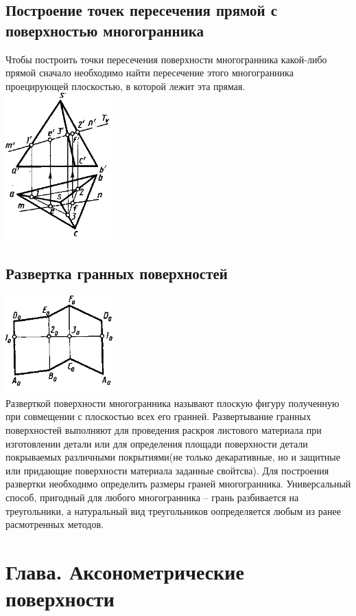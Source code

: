 \documentclass[a4paper, 12pt]{article}
\begin{document}
\subsection{Построение точек пересечения прямой с поверхностью многогранника}
Чтобы построить точки пересечения поверхности многогранника какой-либо прямой сначало необходимо найти пересечение этого многогранника проецирующей плоскостью, в которой лежит эта прямая.\\
\includegraphics{img/643.png}\\

\subsection{Развертка гранных поверхностей}
\includegraphics{img/661.png}\\
Разверткой поверхности многогранника называют плоскую фигуру полученную при совмещении с плоскостью всех его гранней. Развертывание гранных поверхностей выполняют для проведения раскроя листового материала при изготовлении детали или для определения площади поверхности детали покрываемых различными покрытиями(не только декаративные, но и защитные или придающие поверхности материала заданные свойтсва). Для построения развертки необходимо определить размеры граней многогранника. Универсальный способ, пригодный для любого многогранника -- грань разбивается на треугольники, а натуральный вид треугольников оопределяется любым из ранее расмотренных методов.\\

\section{Глава. Аксонометрические поверхности}
\end{document}
